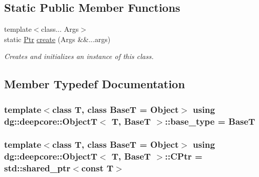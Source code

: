 \subsection*{Static Public Member Functions}
\begin{DoxyCompactItemize}
\item 
{\footnotesize template$<$class... Args$>$ }\\static \hyperlink{classdg_1_1deepcore_1_1_object_t_ab54805874b0d6881bc1d1a2ced7d49bf}{Ptr} \hyperlink{classdg_1_1deepcore_1_1_object_t_af1c55ff313922010d054060c22adbf91}{create} (Args \&\&...args)
\begin{DoxyCompactList}\small\item\em Creates and initializes an instance of this class. \end{DoxyCompactList}\end{DoxyCompactItemize}


\subsection{Member Typedef Documentation}
\subsubsection[{\texorpdfstring{base\+\_\+type}{base_type}}]{\setlength{\rightskip}{0pt plus 5cm}template$<$class T, class BaseT = Object$>$ using {\bf dg\+::deepcore\+::\+ObjectT}$<$ T, BaseT $>$\+::{\bf base\+\_\+type} =  BaseT}\hypertarget{classdg_1_1deepcore_1_1_object_t_af62877471d4b1dc37f23b457fe406814}{}\label{classdg_1_1deepcore_1_1_object_t_af62877471d4b1dc37f23b457fe406814}
\subsubsection[{\texorpdfstring{C\+Ptr}{CPtr}}]{\setlength{\rightskip}{0pt plus 5cm}template$<$class T, class BaseT = Object$>$ using {\bf dg\+::deepcore\+::\+ObjectT}$<$ T, BaseT $>$\+::{\bf C\+Ptr} =  std\+::shared\+\_\+ptr$<$const T$>$}\hypertarget{classdg_1_1deepcore_1_1_object_t_a91edf1cc372d9a68025bed01f08d3a38}{}\label{classdg_1_1deepcore_1_1_object_t_a91edf1cc372d9a68025bed01f08d3a38}
